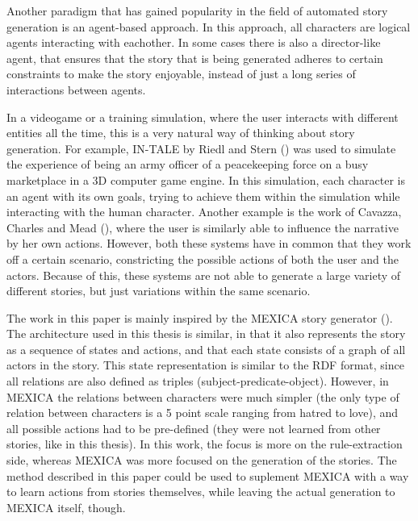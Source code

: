 Another paradigm that has gained popularity in the field of automated story
generation is an agent-based approach. In this approach, all characters are
logical agents interacting with eachother. In some cases there is also a
director-like agent, that ensures that the story that is being generated adheres
to certain constraints to make the story enjoyable, instead of just a long
series of interactions between agents.

In a videogame or a training simulation, where the user interacts with different
entities all the time, this is a very natural way of thinking about story
generation. For example, IN-TALE by Riedl and Stern (\cite{riedl2006believable})
was used to simulate the experience of being an army officer of a peacekeeping force
on a busy marketplace in a 3D computer game engine. In this simulation, each
character is an agent with its own goals, trying to achieve them within the
simulation while interacting with the human character. Another example is the
work of Cavazza, Charles and Mead (\cite{cavazza2002interacting}), where the
user is similarly able to influence the narrative by her own actions. However,
both these systems have in common that they work off a certain scenario,
constricting the possible actions of both the user and the actors. Because of
this, these systems are not able to generate a large variety of different
stories, but just variations within the same scenario.

The work in this paper is mainly inspired by the MEXICA story generator
(\cite{perez2001mexica}).
The architecture used in this thesis is similar, in that it also represents the
story as a sequence of states and actions, and that each state consists of a
graph of all actors in the story. This state representation is similar to the
RDF format, since all relations are also defined as triples
(subject-predicate-object).
However, in MEXICA the relations between characters were much simpler (the only
type of relation between characters is a 5 point scale ranging from hatred to
love), and 
all possible actions had to be pre-defined (they were not learned from other
stories, like in this thesis). In this work, the focus is more on
the rule-extraction side, whereas MEXICA was more focused on the generation of
the stories. The method described in this paper could be used to suplement
MEXICA with a way to learn actions from stories themselves, while leaving the
actual generation to MEXICA itself, though.
